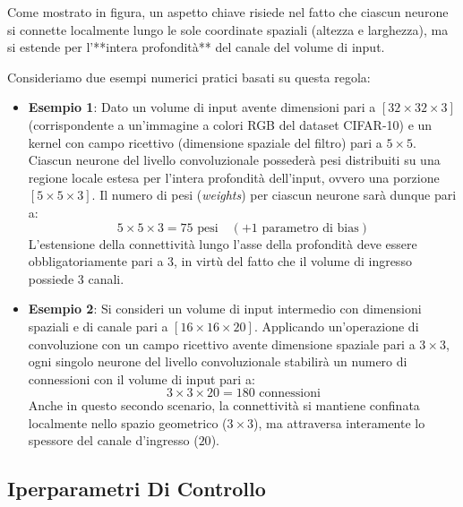 ﻿\documentclass[11pt, a4paper]{article}
\begin{document}

Come mostrato in figura, un aspetto chiave risiede nel fatto che ciascun neurone si connette localmente lungo le sole coordinate spaziali (altezza e larghezza), ma si estende per l'**intera profondità** del canale del volume di input.

Consideriamo due esempi numerici pratici basati su questa regola:
\begin{itemize}
    \item \textbf{Esempio 1}: Dato un volume di input avente dimensioni pari a $[32 \times 32 \times 3]$ (corrispondente a un'immagine a colori RGB del dataset CIFAR-10) e un kernel con campo ricettivo (dimensione spaziale del filtro) pari a $5 \times 5$. Ciascun neurone del livello convoluzionale possederà pesi distribuiti su una regione locale estesa per l'intera profondità dell'input, ovvero una porzione $[5 \times 5 \times 3]$. Il numero di pesi (\emph{weights}) per ciascun neurone sarà dunque pari a:
    \[
    5 \times 5 \times 3 = 75 \text{ pesi} \quad (+ 1 \text{ parametro di bias})
    \]
    L'estensione della connettività lungo l'asse della profondità deve essere obbligatoriamente pari a 3, in virtù del fatto che il volume di ingresso possiede 3 canali.

    \item \textbf{Esempio 2}: Si consideri un volume di input intermedio con dimensioni spaziali e di canale pari a $[16 \times 16 \times 20]$. Applicando un'operazione di convoluzione con un campo ricettivo avente dimensione spaziale pari a $3 \times 3$, ogni singolo neurone del livello convoluzionale stabilirà un numero di connessioni con il volume di input pari a:
    \[
    3 \times 3 \times 20 = 180 \text{ connessioni}
    \]
    Anche in questo secondo scenario, la connettività si mantiene confinata localmente nello spazio geometrico ($3 \times 3$), ma attraversa interamente lo spessore del canale d'ingresso ($20$).
\end{itemize}

\subsection{Iperparametri Di Controllo}
\end{document}

